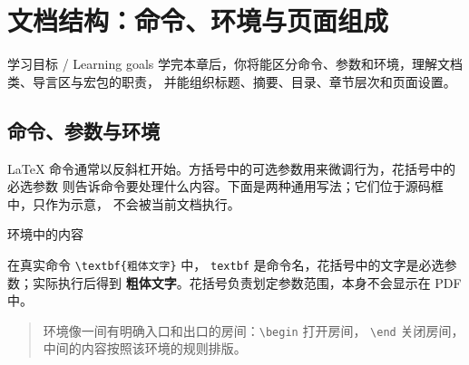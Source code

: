 %
\section{文档结构：命令、环境与页面组成}

\begin{learningbox}{学习目标 / Learning goals}
学完本章后，你将能区分命令、参数和环境，理解文档类、导言区与宏包的职责，
并能组织标题、摘要、目录、章节层次和页面设置。
\end{learningbox}

\subsection{命令、参数与环境}

LaTeX 命令通常以反斜杠开始。方括号中的可选参数用来微调行为，花括号中的必选参数
则告诉命令要处理什么内容。下面是两种通用写法；它们位于源码框中，只作为示意，
不会被当前文档执行。

\begin{codeblock}

\begin{环境名}
环境中的内容
\end{环境名}
\end{codeblock}

在真实命令 \texttt{\textbackslash textbf\{粗体文字\}} 中，
\texttt{textbf} 是命令名，花括号中的文字是必选参数；实际执行后得到
\textbf{粗体文字}。花括号负责划定参数范围，本身不会显示在 PDF 中。

\begin{quote}
环境像一间有明确入口和出口的房间：\texttt{\textbackslash begin} 打开房间，
\texttt{\textbackslash end} 关闭房间，中间的内容按照该环境的规则排版。
\end{quote}

